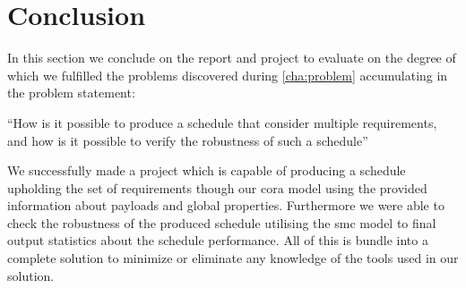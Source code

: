 \section{Conclusion} \label{sec:conclusion}
In this section we conclude on the report and project to evaluate on the degree of which we fulfilled the problems discovered during  \cref{cha:problem} accumulating in the problem statement:

\enquote{How is it possible to produce a schedule that consider multiple requirements, and how is it possible to verify the robustness of such a schedule}

We successfully made a project which is capable of producing a schedule upholding the set of requirements though our \gls{cora} model using the provided information about payloads and global properties. Furthermore we were able to check the robustness of the produced schedule utilising the \gls{smc} model to final output statistics about the schedule performance. All of this is bundle into a complete solution to minimize or eliminate any knowledge of the tools used in our solution.

